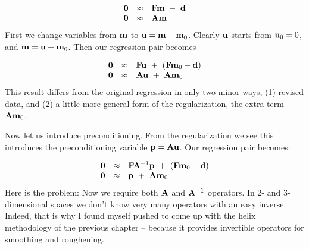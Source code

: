\begin{equation}
\begin{array}{lll}
\label{eq:main}
\bold 0 &\approx& \bold F \bold m \ -\  \bold d \\
\bold 0 &\approx& \bold A \bold m
\end{array}
\end{equation}
First we change variables from $\bold m$ to $\bold u = \bold m - \bold m_0$.
Clearly $\bold u$ starts from $\bold u_0=0$, and $\bold m = \bold u + \bold m_0$.
Then our regression pair becomes

\begin{equation}
\begin{array}{lll}
\label{eq:main}
\bold 0 &\approx& \bold F \bold u \ +\  (\bold F\bold m_0 -\bold d) \\
\bold 0 &\approx& \bold A \bold u \ +\  \bold A \bold m_0
\end{array}
\end{equation}
This result differs from the original regression in only two minor ways,
(1) revised data, and (2) a little more general form of the regularization,
the extra term $\bold A \bold m_0$.

Now let us introduce preconditioning.  From the regularization
we see this introduces the preconditioning variable $\bold p = \bold A\bold u$.
Our regression pair becomes:

\begin{equation}
\begin{array}{lll}
\label{eq:main}
\bold 0 &\approx& \bold F \bold A^{-1} \bold p \ +\  (\bold F\bold m_0 -\bold d) \\
\bold 0 &\approx&                      \bold p \ +\  \bold A \bold m_0
\end{array}
\end{equation}
Here is the problem:
Now we require both $\bold A$ and $\bold A^{-1}$ operators.
In 2- and 3-dimensional spaces we don't know very many operators
with an easy inverse.
Indeed, that is why I found myself pushed to come up with the helix methodology 
of the previous chapter -- because it provides invertible operators for
smoothing and roughening.






